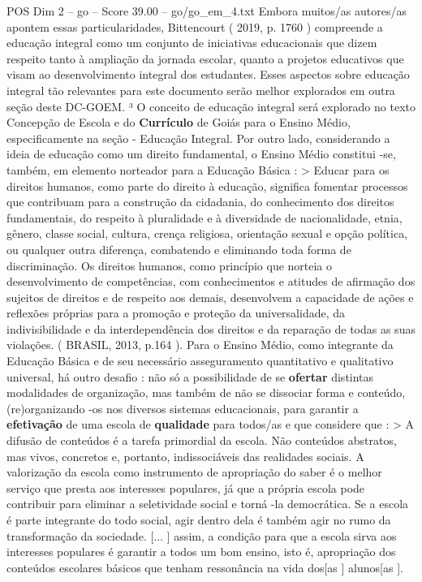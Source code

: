 \begin{textsample}{POS Dim 2 – go – Score 39.00 – go/go\_em\_4.txt}
Embora muitos/as autores/as apontem essas particularidades, Bittencourt ( 2019, p. 1760 ) compreende a educação integral como um conjunto de iniciativas educacionais que dizem respeito tanto à ampliação da jornada escolar, quanto a projetos educativos que visam ao desenvolvimento integral dos estudantes.
Esses aspectos sobre educação integral tão relevantes para este documento serão melhor explorados em outra seção deste DC-GOEM. ³ O conceito de educação integral será explorado no texto Concepção de Escola e do \textbf{Currículo} de Goiás para o Ensino Médio, especificamente na seção - Educação Integral.
Por outro lado, considerando a ideia de educação como um direito fundamental, o Ensino Médio constitui -se, também, em elemento norteador para a Educação Básica : > Educar para os direitos humanos, como parte do direito à educação, significa fomentar processos que contribuam para a construção da cidadania, do conhecimento dos direitos fundamentais, do respeito à pluralidade e à diversidade de nacionalidade, etnia, gênero, classe social, cultura, crença religiosa, orientação sexual e opção política, ou qualquer outra diferença, combatendo e eliminando toda forma de discriminação.
Os direitos humanos, como princípio que norteia o desenvolvimento de competências, com conhecimentos e atitudes de afirmação dos sujeitos de direitos e de respeito aos demais, desenvolvem a capacidade de ações e reflexões próprias para a promoção e proteção da universalidade, da indivisibilidade e da interdependência dos direitos e da reparação de todas as suas violações. ( BRASIL, 2013, p.164 ).
Para o Ensino Médio, como integrante da Educação Básica e de seu necessário asseguramento quantitativo e qualitativo universal, há outro desafio : não só a possibilidade de se \textbf{ofertar} distintas modalidades de organização, mas também de não se dissociar forma e conteúdo, (re)organizando -os nos diversos sistemas educacionais, para garantir a \textbf{efetivação} de uma escola de \textbf{qualidade} para todos/as e que considere que : > A difusão de conteúdos é a tarefa primordial da escola.
Não conteúdos abstratos, mas vivos, concretos e, portanto, indissociáveis das realidades sociais.
A valorização da escola como instrumento de apropriação do saber é o melhor serviço que presta aos interesses populares, já que a própria escola pode contribuir para eliminar a seletividade social e torná -la democrática.
Se a escola é parte integrante do todo social, agir dentro dela é também agir no rumo da transformação da sociedade. [... ] assim, a condição para que a escola sirva aos interesses populares é garantir a todos um bom ensino, isto é, apropriação dos conteúdos escolares básicos que tenham ressonância na vida dos[as ] alunos[as ].

\end{textsample}
